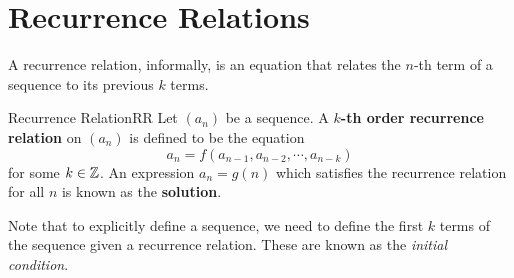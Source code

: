 \documentclass[math]{amznotes}
\theoremstyle{remark}
\begin{document}
\section{Recurrence Relations}
A recurrence relation, informally, is an equation that relates the $n$-th term of a sequence to its previous $k$ terms.
\begin{dfnbox}{Recurrence Relation}{RR}
    Let $(a_n)$ be a sequence. A {\color{red} \textbf{$k$-th order recurrence relation}} on $(a_n)$ is defined to be the equation
    \begin{equation*}
        a_n = f(a_{n - 1}, a_{n - 2}, \cdots, a_{n - k})
    \end{equation*}
    for some $k \in \mathbb{Z}$. An expression $a_n = g(n)$ which satisfies the recurrence relation for all $n$ is known as the {\color{red} \textbf{solution}}. 
\end{dfnbox}
Note that to explicitly define a sequence, we need to define the first $k$ terms of the sequence given a recurrence relation. These are known as the \textit{initial condition}.
\end{document}

